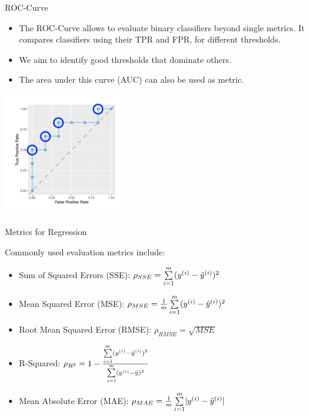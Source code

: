 \documentclass[11pt,compress,t,notes=noshow, xcolor=table]{beamer}
\begin{document}
\begin{vbframe}{ROC-Curve}

\begin{itemize}
\item The ROC-Curve allows to evaluate binary classifiers beyond single metrics.
It compares classifiers using their TPR and FPR, for different thresholds.
\item We aim to identify good thresholds that dominate others.
\item The area under this curve (AUC) can also be used as metric.
\end{itemize}
    \begin{center}
  \includegraphics[width=0.4\textwidth,trim={1.5cm 0 0 1.5cm},clip]{figure/eval_mclass_roc_sp_4a.pdf}
\end{center}


\end{vbframe}


\begin{vbframe}{Metrics for Regression}

Commonly used evaluation metrics include:
\begin{itemize}
\item Sum of Squared Errors (SSE): $\rho_{SSE}=\sum\limits_{i=1}^m (y^{(i)}- \hat{y}^{(i)})^2$
\item Mean Squared Error (MSE): $\rho_{MSE}=\frac{1}{m} \sum\limits_{i=1}^m (y^{(i)}- \hat{y}^{(i)})^2$
\item Root Mean Squared Error (RMSE): $\rho_{RMSE}= \sqrt{MSE}$
\item R-Squared: $\rho_{R^2} = 1 - \frac{\sum\limits_{i=1}^m (y^{(i)}- \hat{y}^{(i)})^2}{\sum\limits_{i=1}^m (y^{(i)} - \bar{y})^2}$
\item Mean Absolute Error (MAE): $\rho_{MAE} = \frac{1}{m} \sum\limits_{i=1}^m \rvert y^{(i)}- \hat{y}^{(i)} \rvert$
\end{itemize}

\end{vbframe}
\end{document}
